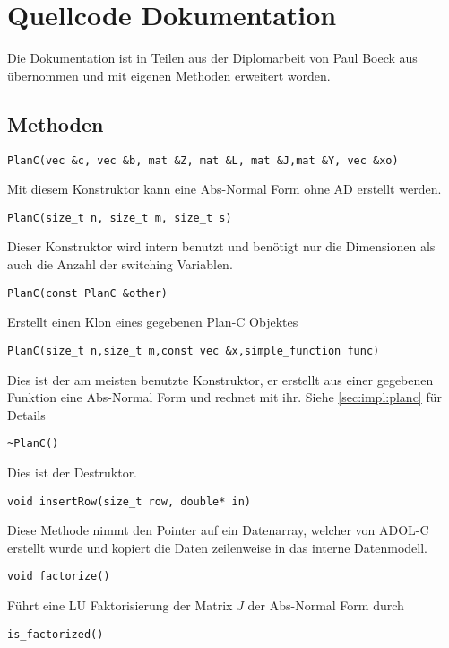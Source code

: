 \chapter{Quellcode Dokumentation}\label{sec:source}
Die Dokumentation ist in Teilen aus der Diplomarbeit von Paul Boeck aus \cite{boeck14} übernommen und mit eigenen Methoden erweitert worden.
\section[Public Methoden]{\texorpdfstring{}{Public} Methoden}
\lstset{
		aboveskip=0pt,
		belowskip=0pt,
		columns=flexible,
	}
\begin{lstlisting}[numbers=none]
PlanC(vec &c, vec &b, mat &Z, mat &L, mat &J,mat &Y, vec &xo)
\end{lstlisting}
Mit diesem Konstruktor kann eine Abs-Normal Form ohne AD erstellt werden.
\begin{lstlisting}[numbers=none]
PlanC(size_t n, size_t m, size_t s)
\end{lstlisting}
Dieser Konstruktor wird intern benutzt und benötigt nur die Dimensionen als auch die Anzahl der switching Variablen.
\begin{lstlisting}[numbers=none]
PlanC(const PlanC &other)
\end{lstlisting}
Erstellt einen Klon eines gegebenen Plan-C Objektes
\begin{lstlisting}[numbers=none]
PlanC(size_t n,size_t m,const vec &x,simple_function func)
\end{lstlisting}
Dies ist der am meisten benutzte Konstruktor, er erstellt aus einer gegebenen Funktion eine Abs-Normal Form und rechnet mit ihr. Siehe \ref{sec:impl:planc} für Details
\begin{lstlisting}[numbers=none]
~PlanC()
\end{lstlisting}
Dies ist der Destruktor.
\begin{lstlisting}[numbers=none]
void insertRow(size_t row, double* in)
\end{lstlisting}
Diese Methode nimmt den Pointer auf ein Datenarray, welcher von ADOL-C erstellt wurde und kopiert die Daten zeilenweise in das interne Datenmodell.
\begin{lstlisting}[numbers=none]
void factorize()
\end{lstlisting}
Führt eine LU Faktorisierung der Matrix $J$ der Abs-Normal Form durch
\begin{lstlisting}[numbers=none]
is_factorized()
\end{lstlisting}
